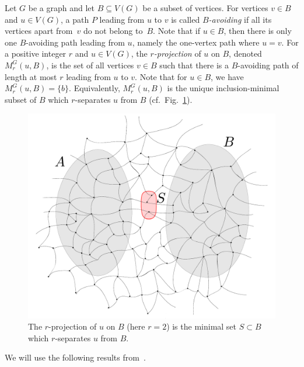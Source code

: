Let $G$ be a graph and let $B\subseteq V(G)$ be a subset of vertices. For vertices $v\in B$ and $u\in V(G)$, a path $P$ leading from $u$ to $v$ is called {\em{$B$-avoiding}}
if all its vertices apart from~$v$ do not belong to~$B$. Note that if $u\in B$, then there is only one $B$-avoiding path leading from $u$, namely the one-vertex path where $u=v$.
For a positive integer $r$ and $u\in V(G)$, the {\em{$r$-projection}} of $u$ on $B$, denoted $M^G_r(u,B)$, is the set of all vertices $v\in B$ such that there is
a $B$-avoiding path of length at most $r$ leading from $u$ to $v$. Note that for $u\in B$, we have $M^G_r(u,B)=\{b\}$.
Equivalently, $M^G_r(u,B)$ is the unique inclusion-minimal
subset of $B$ which $r$-separates $u$ from $B$ (cf.~Fig.~\ref{fig:projection}).

\begin{figure}[h!]
	\centering
		\includegraphics[scale=0.35,page=2]{pics}
	\caption{The  $r$-projection of $u$ on $B$
	(here $r=2$)
	is the minimal set  $S\subset B$
	which $r$-separates $ u$ from $B$.
	}
	\label{fig:projection}
\end{figure}

We will use the following results from~\cite{drange2016kernelization,eickmeyer2016neighborhood}.


